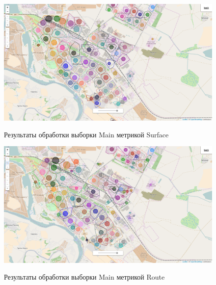 \documentclass[a4paper, 14pt]{extreport}
\begin{document}
\newpage

\begin{figure}[t!]
    \vspace{-10em}
    \centering
    \includegraphics[width=.95\textwidth]{full_surface}\\[1ex]
    \parbox{.95\textwidth}{\caption{Результаты обработки выборки Main метрикой Surface}\label{pic:full-surface}}
    \includegraphics[width=.95\textwidth]{full_route}\\[1ex]
    \parbox{.95\textwidth}{\caption{Результаты обработки выборки Main метрикой Route}\label{pic:full-route}}
\end{figure}
\end{document}
